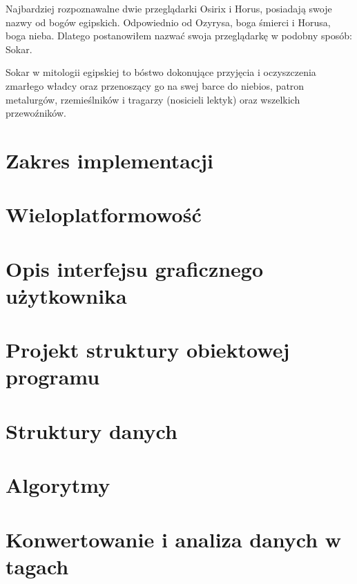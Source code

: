 
\par
Najbardziej rozpoznawalne dwie przeglądarki Osirix i Horus, posiadają swoje nazwy od bogów egipskich.
Odpowiednio od Ozyrysa, boga śmierci i Horusa, boga nieba.
Dlatego postanowiłem nazwać swoja przeglądarkę w podobny sposób: Sokar.
\par
Sokar w mitologii egipskiej to bóstwo dokonujące przyjęcia i oczyszczenia zmarłego władcy oraz przenoszący go na swej barce do niebios, patron metalurgów, rzemieślników i tragarzy (nosicieli lektyk) oraz wszelkich przewoźników.

\section{Zakres implementacji}


\section{Wieloplatformowość}


\section{Opis interfejsu graficznego użytkownika}


\section{Projekt struktury obiektowej programu}
\sokarclassExplanations


\section{Struktury danych}


\section{Algorytmy}


\section{Konwertowanie i analiza danych w tagach}


\section{}


